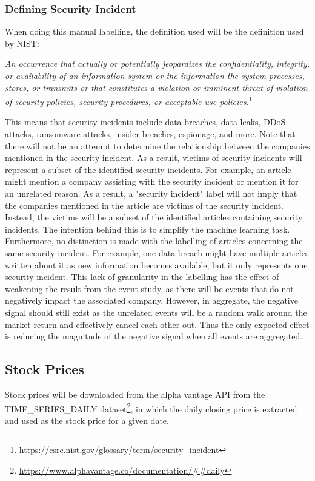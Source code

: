 \subsubsection{Defining Security Incident}
When doing this manual labelling, the definition used will be the definition used by NIST: 
\begin{displayquote}
\textit{An occurrence that actually or potentially jeopardizes the confidentiality, integrity, or availability of an information system or the information the system processes, stores, or transmits or that constitutes a violation or imminent threat of violation of security policies, security procedures, or acceptable use policies.}\footnote{\url{https://csrc.nist.gov/glossary/term/security_incident}}
\end{displayquote}
This means that security incidents include data breaches, data leaks, DDoS attacks, ransomware attacks, insider breaches, espionage, and more. Note that there will not be an attempt to determine the relationship between the companies mentioned in the security incident. As a result, victims of security incidents will represent a subset of the identified security incidents. For example, an article might mention a company assisting with the security incident or mention it for an unrelated reason. As a result, a "security incident" label will not imply that the companies mentioned in the article are victims of the security incident. Instead, the victims will be a subset of the identified articles containing security incidents. The intention behind this is to simplify the machine learning task.
Furthermore, no distinction is made with the labelling of articles concerning the same security incident. For example, one data breach might have multiple articles written about it as new information becomes available, but it only represents one security incident. This lack of granularity in the labelling has the effect of weakening the result from the event study, as there will be events that do not negatively impact the associated company. However, in aggregate, the negative signal should still exist as the unrelated events will be a random walk around the market return and effectively cancel each other out. Thus the only expected effect is reducing the magnitude of the negative signal when all events are aggregated.
\subsection{Stock Prices}
Stock prices will be downloaded from the alpha vantage API from the TIME\_SERIES\_DAILY dataset\footnote{\url{https://www.alphavantage.co/documentation/##daily}}, in which the daily closing price is extracted and used as the stock price for a given date.

